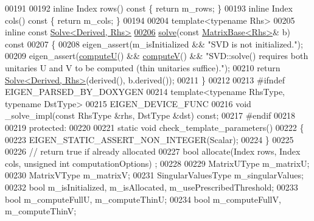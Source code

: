 \begin{DoxyCode}
00191 
00192   \textcolor{keyword}{inline} Index rows()\textcolor{keyword}{ const }\{ \textcolor{keywordflow}{return} m\_rows; \}
00193   \textcolor{keyword}{inline} Index cols()\textcolor{keyword}{ const }\{ \textcolor{keywordflow}{return} m\_cols; \}
00194   
00204   \textcolor{keyword}{template}<\textcolor{keyword}{typename} Rhs>
00205   \textcolor{keyword}{inline} \textcolor{keyword}{const} \hyperlink{group___core___module_class_eigen_1_1_solve}{Solve<Derived, Rhs>}
\hyperlink{group___s_v_d___module_ab28499936c0764fe5b56b9f4de701e26}{00206}   \hyperlink{group___s_v_d___module_ab28499936c0764fe5b56b9f4de701e26}{solve}(\textcolor{keyword}{const} \hyperlink{group___core___module_class_eigen_1_1_matrix_base}{MatrixBase<Rhs>}& b)\textcolor{keyword}{ const}
00207 \textcolor{keyword}{  }\{
00208     eigen\_assert(m\_isInitialized && \textcolor{stringliteral}{"SVD is not initialized."});
00209     eigen\_assert(\hyperlink{group___s_v_d___module_a705a7c2709e1624ccc19aa748a78d473}{computeU}() && \hyperlink{group___s_v_d___module_a5f12efcb791eb007d4a4890ac5255ac4}{computeV}() && \textcolor{stringliteral}{"SVD::solve() requires both unitaries U and V
       to be computed (thin unitaries suffice)."});
00210     \textcolor{keywordflow}{return} \hyperlink{group___core___module_class_eigen_1_1_solve}{Solve<Derived, Rhs>}(derived(), b.derived());
00211   \}
00212   
00213 \textcolor{preprocessor}{  #ifndef EIGEN\_PARSED\_BY\_DOXYGEN}
00214   \textcolor{keyword}{template}<\textcolor{keyword}{typename} RhsType, \textcolor{keyword}{typename} DstType>
00215   EIGEN\_DEVICE\_FUNC
00216   \textcolor{keywordtype}{void} \_solve\_impl(\textcolor{keyword}{const} RhsType &rhs, DstType &dst) \textcolor{keyword}{const};
00217 \textcolor{preprocessor}{  #endif}
00218 
00219 \textcolor{keyword}{protected}:
00220   
00221   \textcolor{keyword}{static} \textcolor{keywordtype}{void} check\_template\_parameters()
00222   \{
00223     EIGEN\_STATIC\_ASSERT\_NON\_INTEGER(Scalar);
00224   \}
00225   
00226   \textcolor{comment}{// return true if already allocated}
00227   \textcolor{keywordtype}{bool} allocate(Index rows, Index cols, \textcolor{keywordtype}{unsigned} \textcolor{keywordtype}{int} computationOptions) ;
00228 
00229   MatrixUType m\_matrixU;
00230   MatrixVType m\_matrixV;
00231   SingularValuesType m\_singularValues;
00232   \textcolor{keywordtype}{bool} m\_isInitialized, m\_isAllocated, m\_usePrescribedThreshold;
00233   \textcolor{keywordtype}{bool} m\_computeFullU, m\_computeThinU;
00234   \textcolor{keywordtype}{bool} m\_computeFullV, m\_computeThinV;

\end{DoxyCode}
